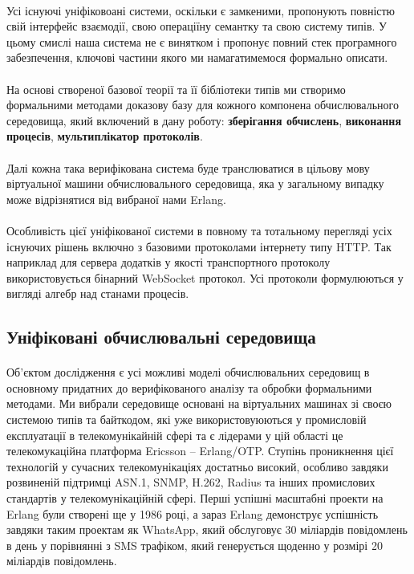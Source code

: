 \documentclass[11pt,oneside]{article}
\begin{document}
   \paragraph{}
   Усі існуючі уніфіковоані системи, оскільки є замкеними, пропонують
   повністю свій інтерфейс взаємодії, свою операціїну семантку та свою систему типів.
   У цьому смислі наша система не є винятком і пропонує повний стек
   програмного забезпечення, ключові частини якого ми намагатимемося формально
   описати.

   \paragraph{}
   На основі створеної базової теорії та її бібліотеки типів ми створимо
   формальними методами доказову базу для кожного компонена обчислювального
   середовища, який включений в дану роботу: {\bf зберігання обчислень},
   {\bf виконання процесів}, {\bf мультиплікатор протоколів}.

   \paragraph{}
   Далі кожна така верифікована система буде транслюватися в цільову мову
   віртуальної машини обчислювального середовища, яка у загальному випадку
   може відрізнятися від вибраної нами Erlang.

   \paragraph{}
   Особливість цієї уніфікованої системи в повному та тотальному перегляді
   усіх існуючих рішень включно з базовими протоколами інтернету типу HTTP.
   Так наприклад для сервера додатків у якості транспортного протоколу
   використовується бінарний WebSocket протокол. Усі протоколи формулюються
   у вигляді алгебр над станами процесів.

\subsection*{Уніфіковані обчислювальні середовища}

   \paragraph{}
   Об’єктом дослідження є усі можливі моделі обчислювальних середовищ в основному придатних
   до верифікованого аналізу та обробки формальними методами. Ми вибрали середовище
   основані на віртуальних машинах зі своєю системою типів та байткодом, які уже
   використовуюються у промисловій експлуатації в телекомунікайній сфері та є лідерами
   у цій області це телекомукаційна платформа Ericsson -- Erlang/OTP. Ступінь проникнення
   цієї технологій у сучасних телекомунікаціях достатньо високий, особливо завдяки
   розвиненій підтримці ASN.1, SNMP, H.262, Radius та інших промислових стандартів
   у телекомунікаційній сфері. Перші успішні масштабні проекти на Erlang були створені ще у
   1986 році, а зараз Erlang демонструє успішність завдяки таким проектам як WhatsApp, який
   обслуговує 30 міліардів повідомлень в день у порівнянні з SMS трафіком,
   який генерується щоденно у розмірі 20 міліардів повідомлень.
\end{document}
